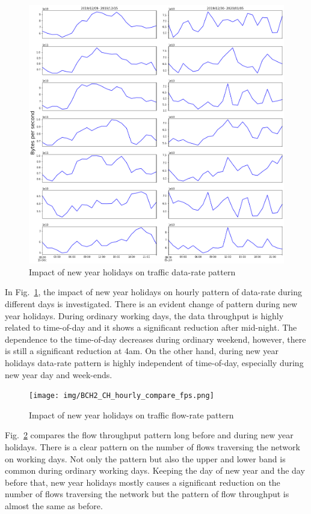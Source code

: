 \documentclass[10pt, journal, letterpaper]{IEEEtran}
\begin{document}
\begin{figure}
    \centering
    \includegraphics[width=\columnwidth]{img/BCH2_CH2_hourly_compare_bps.png}
    \caption{Impact of new year holidays on traffic data-rate pattern}
    \label{fig:BCH2_CH2_hourly_bps}
\end{figure}
In Fig.~\ref{fig:BCH2_CH2_hourly_bps}, the impact of new year holidays on hourly pattern of data-rate during different days is investigated. There is an evident change of pattern during new year holidays. During ordinary working days, the data throughput is highly related to time-of-day and it shows a significant reduction after mid-night. The dependence to the time-of-day decreases during ordinary weekend, however, there is still a significant reduction at 4am. On the other hand, during new year holidays data-rate pattern is highly independent of time-of-day, especially during new year day and week-ends.

\begin{figure}
    \centering
    \texttt{[image: img/BCH2\_CH\_hourly\_compare\_fps.png]}
    \caption{Impact of new year holidays on traffic flow-rate pattern}
    \label{fig:BCH2_CH2_hourly_fps}
\end{figure}
Fig.~\ref{fig:BCH2_CH2_hourly_fps} compares the flow throughput pattern long before and during new year holidays. There is a clear pattern on the number of flows traversing the network on working days. Not only the pattern but also the upper and lower band is common during ordinary working days. Keeping the day of new year and the day before that, new year holidays mostly causes a significant reduction on the number of flows traversing the network but the pattern of flow throughput is almost the same as before. 
\end{document}

